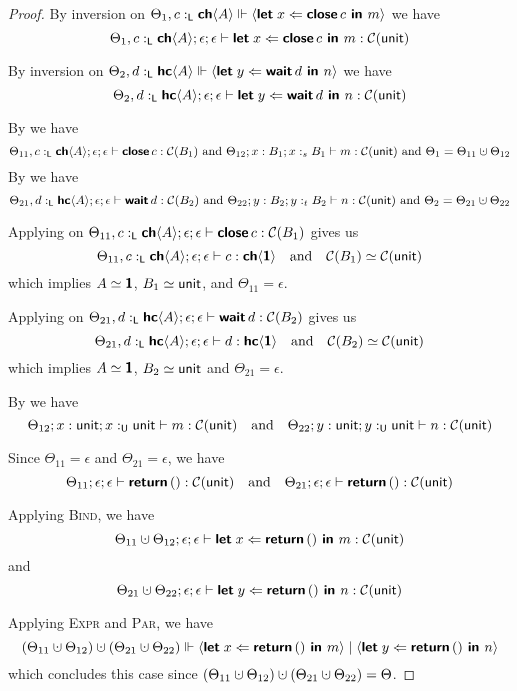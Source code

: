 \begin{proof}
  \noindent
  By inversion on $\Theta_1, c :_{\textsf{L}} {\textbf{\textsf{ch}}\langle{A}\rangle} \Vdash {\langle{\textbf{\textsf{let}}\;{x}\Leftarrow{\textbf{\textsf{close}}\,{c}}\textbf{\textsf{ in }}{m}}\rangle}$ we have
  $$\Theta_1, c :_{\textsf{L}} {\textbf{\textsf{ch}}\langle{A}\rangle} ; \epsilon ; \epsilon \vdash \textbf{\textsf{let}}\;{x}\Leftarrow{\textbf{\textsf{close}}\,{c}}\textbf{\textsf{ in }}{m} : \mathcal{C}({\textsf{unit}})$$

  \noindent
  By inversion on $\Theta_2, d :_{\textsf{L}} {\textbf{\textsf{hc}}\langle{A}\rangle} \Vdash {\langle{\textbf{\textsf{let}}\;{y}\Leftarrow{\textbf{\textsf{wait}}\,{d}}\textbf{\textsf{ in }}{n}}\rangle}$ we have
  $$\Theta_2, d :_{\textsf{L}} {\textbf{\textsf{hc}}\langle{A}\rangle} ; \epsilon ; \epsilon \vdash \textbf{\textsf{let}}\;{y}\Leftarrow{\textbf{\textsf{wait}}\,{d}}\textbf{\textsf{ in }}{n} : \mathcal{C}({\textsf{unit}})$$

  \noindent
  By  we have
  $$
    \Theta_{11}, c \tL \CH{A} ; \epsilon ; \epsilon \vdash \close{c} : \CM{B_1}
    \text{ and }
    \Theta_{12} ; x : B_1 ; x :_s B_1 \vdash m : \CM{\unit}
    \text{ and } {\Theta_1 = \Theta_{11} \dotcup \Theta_{12}}
  $$
  By  we have
  $$
    \Theta_{21}, d \tL \HC{A} ; \epsilon ; \epsilon \vdash \wait{d} : \CM{B_2}
    \text{ and }
    \Theta_{22}  ; y : B_2 ; y :_t B_2 \vdash n : \CM{\unit}
    \text{ and } {\Theta_2 = \Theta_{21} \dotcup \Theta_{22}}
  $$

  \noindent
  Applying  on 
  $\Theta_{11}, c :_{\textsf{L}} {\textbf{\textsf{ch}}\langle{A}\rangle} ; \epsilon ; \epsilon \vdash \textbf{\textsf{close}}\,{c} : \mathcal{C}({B_1})$ gives us
  $$
    \Theta_{11}, c :_{\textsf{L}} {\textbf{\textsf{ch}}\langle{A}\rangle} ; \epsilon ; \epsilon \vdash c : {\textbf{\textsf{ch}}\langle{\textbf{\textsf{1}}}\rangle}
    \quad\text{and}\quad
    \mathcal{C}({B_1}) \simeq \mathcal{C}({\textsf{unit}})
  $$
  which implies $A \simeq \textbf{\textsf{1}}$, $B_1 \simeq \textsf{unit}$, and $\Theta_{11} = \epsilon$.

  \noindent
  Applying  on
  $\Theta_{21}, d :_{\textsf{L}} {\textbf{\textsf{hc}}\langle{A}\rangle} ; \epsilon ; \epsilon \vdash \textbf{\textsf{wait}}\,{d} : \mathcal{C}({B_2})$ gives us
  $$
    \Theta_{21}, d :_{\textsf{L}} {\textbf{\textsf{hc}}\langle{A}\rangle} ; \epsilon ; \epsilon \vdash d : {\textbf{\textsf{hc}}\langle{\textbf{\textsf{1}}}\rangle}
    \quad\text{and}\quad
    \mathcal{C}({B_2}) \simeq \mathcal{C}({\textsf{unit}})
  $$
  which implies $A \simeq \textbf{\textsf{1}}$, $B_2 \simeq \textsf{unit}$ and $\Theta_{21} = \epsilon$.

  \noindent
  By  we have
  $$
    \Theta_{12} ; x : \textsf{unit} ; x :_{\textsf{U}} \textsf{unit} \vdash m : \mathcal{C}({\textsf{unit}})
    \quad\text{and}\quad
    \Theta_{22}  ; y : \textsf{unit} ; y :_{\textsf{U}} \textsf{unit} \vdash n : \mathcal{C}({\textsf{unit}})
  $$

  \noindent
  Since $\Theta_{11} = \epsilon$ and $\Theta_{21} = \epsilon$, we have
  $$
    \Theta_{11} ; \epsilon ; \epsilon \vdash \textbf{\textsf{return}}\,{{()}} : \mathcal{C}({\textsf{unit}})
    \quad\text{and}\quad
    \Theta_{21} ; \epsilon ; \epsilon \vdash \textbf{\textsf{return}}\,{{()}} : \mathcal{C}({\textsf{unit}})
  $$

  \noindent
  Applying \textsc{Bind}, we have
  $$\Theta_{11} \dotcup \Theta_{12} ; \epsilon ; \epsilon \vdash \letin{x}{\return{\ii}}{m} : \CM{\unit}$$
  and 
  $$\Theta_{21} \dotcup \Theta_{22} ; \epsilon ; \epsilon \vdash \letin{y}{\return{\ii}}{n} : \CM{\unit}$$

  \noindent
  Applying \textsc{Expr} and \textsc{Par}, we have
  $$(\Theta_{11} \dotcup \Theta_{12}) \dotcup (\Theta_{21} \dotcup \Theta_{22}) \Vdash \proc{\letin{x}{\return{\ii}}{m}} \mid \proc{\letin{y}{\return{\ii}}{n}}$$
  which concludes this case since $(\Theta_{11} \dotcup \Theta_{12}) \dotcup (\Theta_{21} \dotcup \Theta_{22}) = \Theta$.
\end{proof}